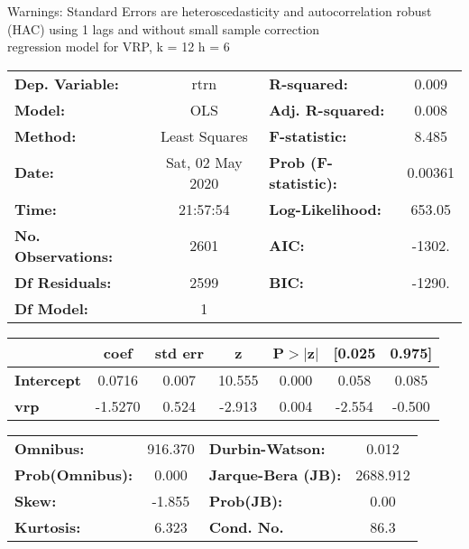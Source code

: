 Warnings: \newline
 [1] Standard Errors are heteroscedasticity and autocorrelation robust (HAC) using 1 lags and without small sample correction\\ 

regression model for VRP, k = 12 h = 6\begin{center}
\begin{tabular}{lclc}
\toprule
\textbf{Dep. Variable:}    &       rtrn       & \textbf{  R-squared:         } &     0.009   \\
\textbf{Model:}            &       OLS        & \textbf{  Adj. R-squared:    } &     0.008   \\
\textbf{Method:}           &  Least Squares   & \textbf{  F-statistic:       } &     8.485   \\
\textbf{Date:}             & Sat, 02 May 2020 & \textbf{  Prob (F-statistic):} &  0.00361    \\
\textbf{Time:}             &     21:57:54     & \textbf{  Log-Likelihood:    } &    653.05   \\
\textbf{No. Observations:} &        2601      & \textbf{  AIC:               } &    -1302.   \\
\textbf{Df Residuals:}     &        2599      & \textbf{  BIC:               } &    -1290.   \\
\textbf{Df Model:}         &           1      & \textbf{                     } &             \\
\bottomrule
\end{tabular}
\begin{tabular}{lcccccc}
                   & \textbf{coef} & \textbf{std err} & \textbf{z} & \textbf{P$> |$z$|$} & \textbf{[0.025} & \textbf{0.975]}  \\
\midrule
\textbf{Intercept} &       0.0716  &        0.007     &    10.555  &         0.000        &        0.058    &        0.085     \\
\textbf{vrp}       &      -1.5270  &        0.524     &    -2.913  &         0.004        &       -2.554    &       -0.500     \\
\bottomrule
\end{tabular}
\begin{tabular}{lclc}
\textbf{Omnibus:}       & 916.370 & \textbf{  Durbin-Watson:     } &    0.012  \\
\textbf{Prob(Omnibus):} &   0.000 & \textbf{  Jarque-Bera (JB):  } & 2688.912  \\
\textbf{Skew:}          &  -1.855 & \textbf{  Prob(JB):          } &     0.00  \\
\textbf{Kurtosis:}      &   6.323 & \textbf{  Cond. No.          } &     86.3  \\
\bottomrule
\end{tabular}
\end{center}

